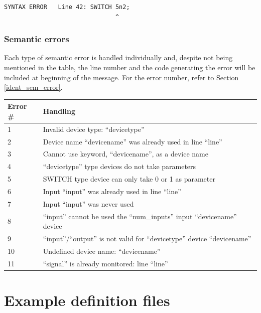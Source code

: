 \documentclass[a4paper,11pt]{article}
\numberwithin{equation}{section}
\begin{document}
\begin{lstlisting}
SYNTAX ERROR   Line 42: SWITCH 5n2;
                               ^
\end{lstlisting}
\subsubsection{Semantic errors}
Each type of semantic error is handled individually and, despite not being mentioned in the table, the line number and the code generating the error will be included at beginning of the message. For the error number, refer to Section \ref{ident_sem_error}.

\begin{center}
	\begin{tabular}{l l}
		\hline
		\textbf{Error \#} & \textbf{Handling} \\ 
		\hline
		1 & Invalid device type: ``devicetype'' \\ 
		2 & Device name ``devicename'' was already used in line ``line''  \\ 
		3 & Cannot use keyword, ``devicename'', as a device name \\ 
		4 & ``devicetype'' type devices do not take parameters   \\ 
		5& SWITCH type device can only take 0 or 1 as parameter \\
		6 & Input ``input'' was already used in line “line”  \\
		7 & Input {``input''} was never used   \\
		8 & ``input'' cannot be used the ``num\_inputs'' input ``devicename'' device  \\
		9 & ``input''/``output'' is not valid for ``devicetype'' device ``devicename''   \\ 
		10 & Undefined device name:  ``devicename''  \\ 
		11 & ``signal'' is already monitored: line ``line'' \\
	\end{tabular}
	\label{bandwidth-efficiency}
\end{center}

\section{Example definition files}

\end{document}
